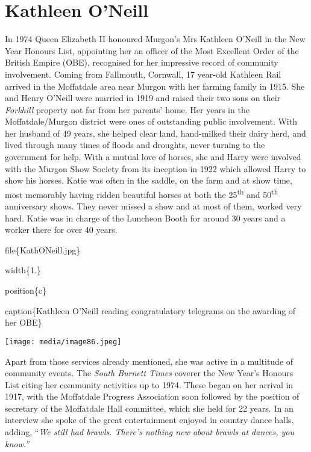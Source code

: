 \hypertarget{kathleen-oneill}{%
\section{Kathleen O'Neill}\label{kathleen-oneill}}

In 1974 Queen Elizabeth II honoured Murgon's Mrs Kathleen O'Neill in the New Year Honours List, appointing her an officer of the Most Excellent Order of the British Empire (OBE), recognised for her impressive record of community involvement. Coming from Fallmouth, Cornwall, 17 year-old Kathleen Rail arrived in the Moffatdale area near Murgon with her farming family in 1915. She and Henry O'Neill were married in 1919 and raised their two sons on their \emph{Forkhill} property not far from her parents' home. Her years in the Moffatdale/Murgon district were ones of outstanding public involvement. With her husband of 49 years, she helped clear land, hand-milked their dairy herd, and lived through many times of floods and droughts, never turning to the government for help. With a mutual love of horses, she and Harry were involved with the Murgon Show Society from its inception in 1922 which allowed Harry to show his horses. Katie was often in the saddle, on the farm and at show time, most memorably having ridden beautiful horses at both the 25\textsuperscript{th} and 50\textsuperscript{th} anniversary shows. They never missed a show and at most of them, worked very hard. Katie was in charge of the Luncheon Booth for around 30 years and a worker there for over 40 years.

file\{KathONeill.jpg\}

width\{1.\}

position\{c\}

caption\{Kathleen O'Neill reading congratulatory telegrams on the awarding of her OBE\}

\texttt{[image: media/image86.jpeg]}

Apart from those services already mentioned, she was active in a multitude of community events. The \emph{South Burnett Times} coverer the New Year's Honours List citing her community activities up to 1974. These began on her arrival in 1917, with the Moffatdale Progress Association soon followed by the position of secretary of the Moffatdale Hall committee, which she held for 22 years. In an interview she spoke of the great entertainment enjoyed in country dance halls, adding, ``\emph{We still had brawls. There's nothing new about brawls at dances, you know.''}

